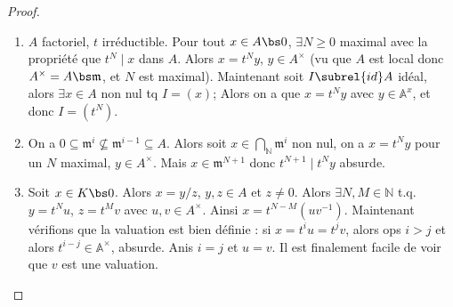         \begin{proof}
            \begin{enumerate}
                \item $A$ factoriel, $t$ irréductible. Pour tout $x \in A \bs 0$, $\exists N \geq 0$ maximal avec la propriété que $t^N \mid x$ dans $A$. Alors $x = t^Ny$, $y \in A^\times$ (vu que $A$ est local donc $A^\times = A \bs \mathfrak{m}$, et $N$ est maximal). Maintenant soit $I \subrel{id} A$ idéal, alors $\exists x \in A$ non nul tq $I = (x)$; Alors on a que $x = t^Ny$ avec $y \in \mathbb{A}^x$, et donc $I = (t^N)$.
                \item On a $0 \subseteq \mathfrak{m}^i \nsubseteq \mathfrak{m}^{i-1} \subseteq A$. Alors soit $x \in \bigcap_{\mathbb{N}} \mathfrak{m}^i$ non nul, on a $x = t^Ny$ pour un $N$ maximal, $y \in A^\times$. Mais $x \in \mathfrak{m}^{N+1}$ donc $t^{N+1} \mid t^Ny$ absurde.
                \item Soit $x \in K \bs 0$. Alors $x = y/z$, $y,z \in A$ et $z \neq 0$. Alors $\exists N,M \in \mathbb{N}$ t.q. $y = t^Nu$, $z = t^Mv$ avec $u,v \in A^\times$. Ainsi $x = t^{N-M}(uv^{-1})$. Maintenant vérifions que la valuation est bien définie : si $x = t^iu = t^jv$, alors ops $i > j$ et alors $t^{i-j} \in \mathbb{A}^\times$, absurde. Anis $i = j$ et $u = v$. Il est finalement facile de voir que $v$ est une valuation.
            \end{enumerate}
        \end{proof}

